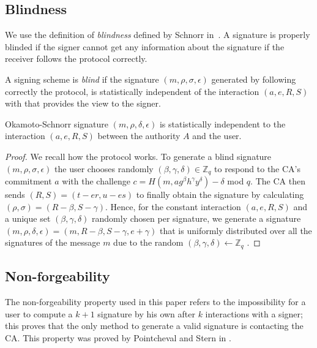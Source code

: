 \documentclass[conference]{llncs}
\begin{document}
\subsection{Blindness}

We use the definition of \emph{blindness} defined by Schnorr in~\cite{schnorr2001security}. A signature is properly blinded if the signer cannot get any information about the signature if the receiver follows the protocol correctly.

\begin{definition}
A signing scheme is \emph{blind} if the signature $(m,\rho,\sigma,\epsilon)$ generated by following correctly the protocol, is statistically independent of the interaction $(a,e,R,S)$ with that provides the view to the signer.
\end{definition}

\begin{theorem}
Okamoto-Schnorr signature $(m,\rho,\delta,\epsilon)$ is statistically independent to the interaction $(a,e,R,S)$ between the authority $A$ and the user.
\end{theorem}

\begin{proof}
We recall how the protocol works. To generate a blind signature $(m,\rho,\sigma,\epsilon)$ the user chooses randomly $(\beta,\gamma,\delta)\in \mathbb{Z}_q$ to respond to the CA's commitment $a$ with the challenge $c=H(m,ag^\beta h^\gamma y^\delta) -\delta$ mod $q$. The CA then sends $(R,S)=(t-er,u-es)$ to finally obtain the signature by calculating $(\rho,\sigma)=(R-\beta,S-\gamma)$.
Hence, for the constant interaction $(a,e,R,S)$ and a unique set $(\beta,\gamma,\delta)$ randomly chosen per signature, we generate a signature $(m,\rho,\delta,\epsilon)=(m,R-\beta,S-\gamma,e+\gamma)$ that is uniformly distributed over all the signatures of the message $m$ due to the random $(\beta,\gamma,\delta) \gets \mathbb{Z}_q$ \cite{schnorr2001security}.
\end{proof}

\subsection{Non-forgeability}
The non-forgeability property used in this paper refers to the impossibility for a user to compute a $k+1$ signature by his own after $k$ interactions with a signer; this proves that the only method to generate a valid signature is contacting the CA. This property was proved by Pointcheval and Stern in \cite{pointcheval1996provably}.
\end{document}
